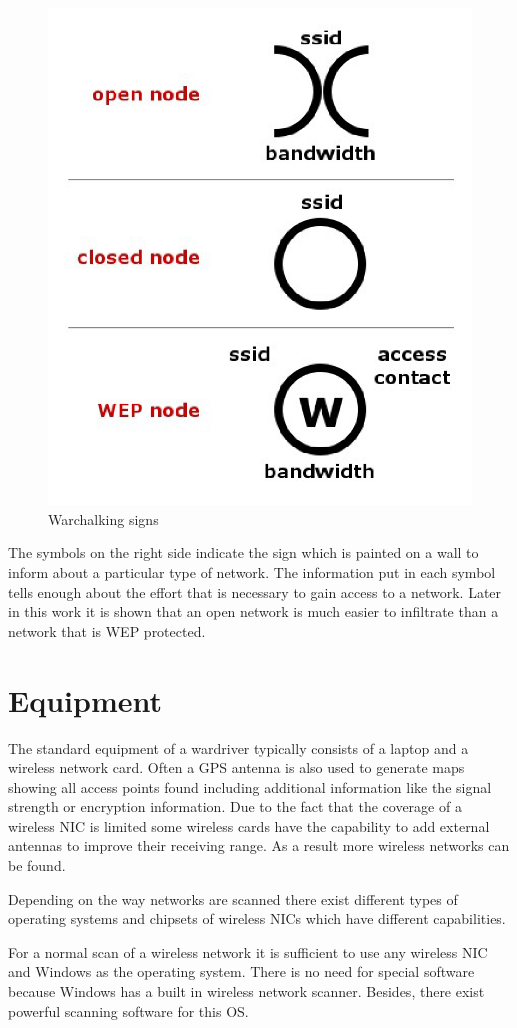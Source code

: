 \begin{figure}[htbp]
	\vspace{1em}
	\begin{center}
		\includegraphics[width=0.45\columnwidth]{graphics/Warchalk}
	\end{center}
	\vspace{-1em}
	\caption{Warchalking signs \cite{warchalkingimg}}
	\label{warchalk}
\end{figure}

The symbols on the right side indicate the sign which is painted on a wall to inform about a particular type of network. The information put in each symbol tells enough about the effort that is necessary to gain access to a network. Later in this work it is shown that an open network is much easier to infiltrate than a network that is WEP protected.

\section{Equipment}

The standard equipment of a wardriver typically consists of a laptop and a wireless network card. Often a GPS antenna is also used to generate maps showing all access points found including additional information like the signal strength or encryption information. Due to the fact that the coverage of a wireless NIC is limited some wireless cards have the capability to add external antennas to improve their receiving range. As a result more wireless networks can be found.

Depending on the way networks are scanned there exist different types of operating systems and chipsets of wireless NICs which have different capabilities.

For a normal scan of a wireless network it is sufficient to use any wireless NIC and Windows as the operating system. There is no need for special software because Windows has a built in wireless network scanner. Besides, there exist powerful scanning software for this \ac{OS}.

